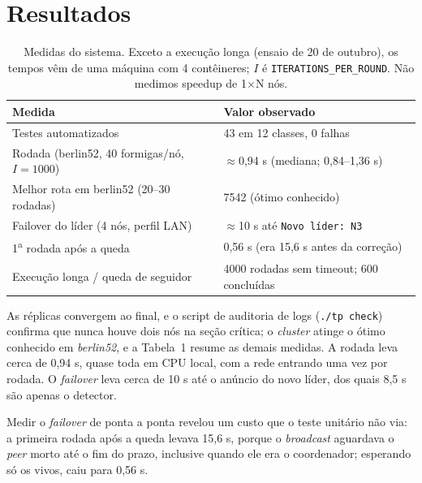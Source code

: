 \section{Resultados}

\begin{table}[t]
  \centering
  \footnotesize
  \begin{tabular}{@{}p{7.3cm}p{6.4cm}@{}}
    \toprule
    Medida & Valor observado \\
    \midrule
    Testes automatizados                            & 43 em 12 classes, 0 falhas \\
    Rodada (berlin52, 40 formigas/n\'o, $I{=}1000$) & $\approx$0,94 s (mediana; 0,84--1,36 s) \\
    Melhor rota em berlin52 (20--30 rodadas)        & 7542 (\'otimo conhecido) \\
    Failover do l\'ider (4 n\'os, perfil LAN)       & $\approx$10 s at\'e \texttt{Novo l\'ider: N3} \\
    1\textsuperscript{a} rodada ap\'os a queda      & 0,56 s (era 15,6 s antes da corre\c{c}\~ao) \\
    Execu\c{c}\~ao longa / queda de seguidor        & 4000 rodadas sem timeout; 600 conclu\'idas \\
    \bottomrule
  \end{tabular}
  \caption{Medidas do sistema. Exceto a execu\c{c}\~ao longa (ensaio de 20 de outubro), os tempos
  v\^em de uma m\'aquina com 4 cont\^eineres; $I$ \'e \texttt{ITERATIONS\_PER\_ROUND}.
  N\~ao medimos speedup de 1$\times$N n\'os.}
  \label{tab:resultados}
\end{table}

As réplicas convergem ao final, e o script de auditoria de logs (\texttt{./tp check}) confirma que
nunca houve dois nós na seção crítica; o \textit{cluster} atinge o ótimo conhecido em
\textit{berlin52}, e a Tabela~1 resume as demais medidas. A rodada leva cerca de 0,94 s, quase toda
em CPU local, com a rede entrando uma vez por rodada. O \textit{failover} leva cerca de 10 s até o anúncio do novo líder, dos quais 8,5 s
são apenas o detector.

Medir o \textit{failover} de ponta a ponta revelou um custo que o teste unitário não via: a primeira
rodada após a queda levava 15,6 s, porque o \textit{broadcast} aguardava o \textit{peer} morto até o
fim do prazo, inclusive quando ele era o coordenador; esperando só os vivos, caiu para 0,56 s.
